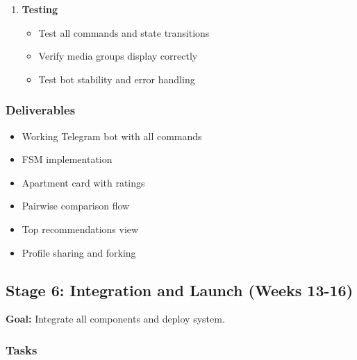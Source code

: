 \documentclass[12pt,a4paper]{article}
\begin{document}
\begin{enumerate}
    \item \textbf{Testing}
    \begin{itemize}
        \item Test all commands and state transitions
        \item Verify media groups display correctly
        \item Test bot stability and error handling
    \end{itemize}
\end{enumerate}

\subsubsection{Deliverables}
\begin{itemize}
    \item Working Telegram bot with all commands
    \item FSM implementation
    \item Apartment card with ratings
    \item Pairwise comparison flow
    \item Top recommendations view
    \item Profile sharing and forking
\end{itemize}

\subsection{Stage 6: Integration and Launch (Weeks 13-16)}

\textbf{Goal:} Integrate all components and deploy system.

\subsubsection{Tasks}
\end{document}
